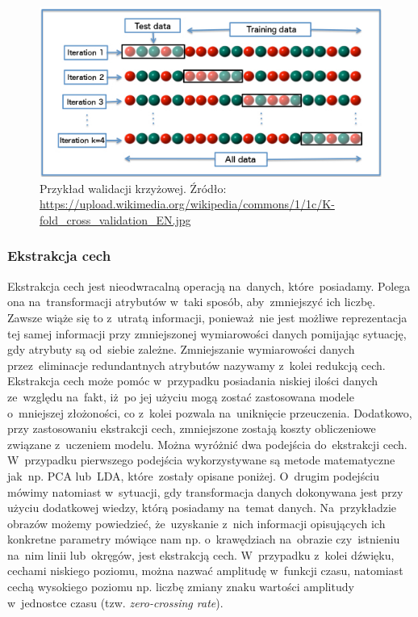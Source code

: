 \begin{figure}[ht!]
\centering
\includegraphics[scale=0.7]{res/cv.jpg}
\caption[Caption for LOF]{Przykład walidacji krzyżowej. Źródło: \url{https://upload.wikimedia.org/wikipedia/commons/1/1c/K-fold_cross_validation_EN.jpg}} \label{cv} 
\end{figure}


\subsubsection{Ekstrakcja cech}
Ekstrakcja cech jest nieodwracalną operacją na~danych, które~posiadamy. Polega ona na~transformacji atrybutów w~taki sposób, aby~zmniejszyć ich liczbę. Zawsze wiąże się to z~utratą informacji, ponieważ~nie jest możliwe reprezentacja tej samej informacji przy zmniejszonej wymiarowości danych pomijając sytuację, gdy atrybuty są od~siebie zależne. Zmniejszanie wymiarowości danych przez~eliminacje redundantnych atrybutów nazywamy z~kolei redukcją cech.  Ekstrakcja cech może pomóc w~przypadku posiadania niskiej ilości danych ze~względu na~fakt, iż~po jej użyciu mogą zostać zastosowana modele o~mniejszej złożoności, co z~kolei pozwala na~uniknięcie przeuczenia. Dodatkowo, przy zastosowaniu ekstrakcji cech, zmniejszone zostają koszty obliczeniowe związane z~uczeniem modelu. Można wyróżnić dwa podejścia do~ekstrakcji cech. W~przypadku pierwszego podejścia wykorzystywane są metode matematyczne jak~np. PCA lub~LDA, które~zostały opisane poniżej. O~drugim podejściu mówimy natomiast w~sytuacji, gdy transformacja danych dokonywana jest przy użyciu dodatkowej wiedzy, którą posiadamy na~temat danych. Na~przykładzie obrazów możemy powiedzieć, że~uzyskanie z~nich informacji opisujących ich konkretne parametry mówiące nam np. o~krawędziach na~obrazie czy~istnieniu na~nim linii lub~okręgów, jest ekstrakcją cech. W~przypadku z~kolei dźwięku, cechami niskiego poziomu, można nazwać amplitudę w~funkcji czasu, natomiast cechą wysokiego poziomu np. liczbę zmiany znaku wartości amplitudy w~jednostce czasu (tzw. \textit{zero-crossing rate}).
